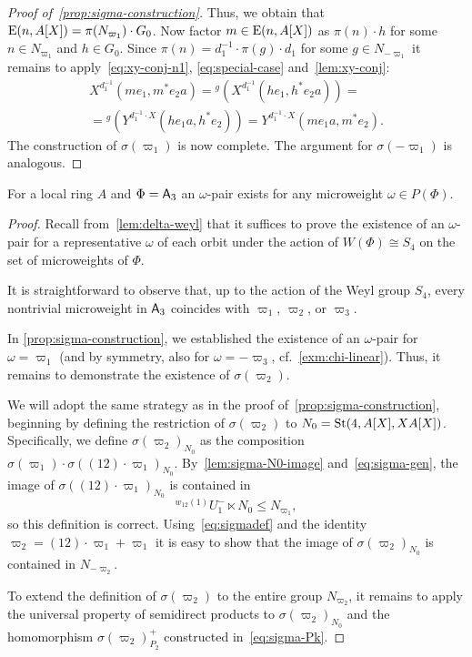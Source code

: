 \begin{proof}[Proof of~\cref{prop:sigma-construction}]
    Thus, we obtain that $\operatorname{E}(n, A[X]) = \pi(N_{\varpi_1}) \cdot G_0$.
    Now factor $m \in \operatorname{E}(n, A[X])$ as $\pi(n) \cdot h$ for some $n\in N_{\varpi_1}$ and $h \in G_0$.
    Since $\pi(n) = d_1^{-1} \cdot \pi(g) \cdot d_1$ for some $g \in N_{-\varpi_1}$ it remains to apply~\eqref{eq:xy-conj-n1}, \eqref{eq:special-case} and~\cref{lem:xy-conj}:
    \begin{multline}
        \nonumber X^{d_1^{-1}}(me_1, m^*e_{2}a) = {}^{g}(X^{d_1^{-1}}(he_1, h^*e_{2}a)) = \\
        = {}^{g}(Y^{d_1^{-1} \cdot X}(he_{1}a, h^*e_2)) = Y^{d_1^{-1} \cdot X}(me_{1}a, m^{*} e_{2}).
    \end{multline}
    The construction of $\sigma(\varpi_1)$ is now complete.
    The argument for $\sigma(-\varpi_1)$ is analogous.
\end{proof}

\begin{cor} \label{cor:a3-microweight}
    For a local ring $A$ and $\Phi = \mathsf{A}_3$ an $\omega$-pair exists for any microweight $\omega \in P(\Phi)$.
\end{cor}
\begin{proof}
    Recall from~\cref{lem:delta-weyl} that it suffices to prove the existence of an $\omega$-pair for a representative $\omega$
    of each orbit under the action of $W(\Phi) \cong S_4$ on the set of microweights of $\Phi$.

    It is straightforward to observe that, up to the action of the Weyl group $S_4$, every nontrivial microweight in $\mathsf{A}_3$ coincides with
    $\varpi_1$, $\varpi_2$, or $\varpi_3$.

    In \cref{prop:sigma-construction}, we established the existence of an $\omega$-pair for $\omega = \varpi_1$
    (and by symmetry, also for $\omega = -\varpi_3$, cf.~\cref{exm:chi-linear}). Thus, it remains to demonstrate the existence of $\sigma(\varpi_2)$.

    We will adopt the same strategy as in the proof of~\cref{prop:sigma-construction}, beginning by defining the restriction of $\sigma(\varpi_2)$ to $N_0 = \operatorname{St}(4, A[X], XA[X])$.
    Specifically, we define $\sigma(\varpi_2)_{N_0}$ as the composition
    $\sigma(\varpi_1) \cdot \sigma((12) \cdot \varpi_1)_{N_0}$.
    By~\cref{lem:sigma-N0-image} and~\eqref{eq:sigma-gen}, the image of $\sigma((12) \cdot \varpi_1)_{N_0}$ is contained in
    \[{}^{w_{12}(1)}U_1^- \ltimes N_0 \leq N_{\varpi_1},\] so this definition is correct.
    Using~\eqref{eq:sigmadef} and the identity
    $\varpi_2 = (12) \cdot \varpi_1 + \varpi_1$ it is easy to show that the image of $\sigma(\varpi_2)_{N_0}$ is contained in $N_{-\varpi_2}$.

    To extend the definition of $\sigma(\varpi_2)$ to the entire group $N_{\varpi_2}$, it remains to apply the universal property of semidirect products to
    $\sigma(\varpi_2)_{N_0}$ and the homomorphism $\sigma(\varpi_2)_{P_2}^+$ constructed in~\eqref{eq:sigma-Pk}.
\end{proof}

